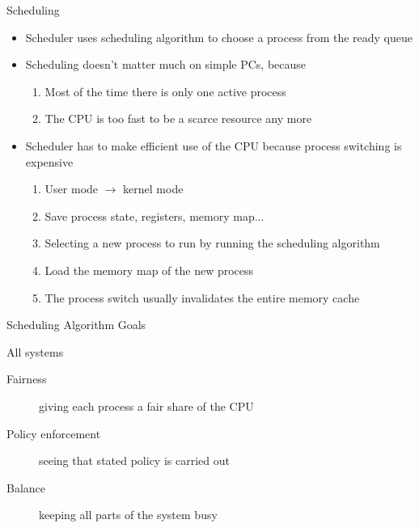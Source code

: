 \begin{frame}{Scheduling}
  \begin{itemize}
  \item \alert{Scheduler} uses \alert{scheduling algorithm} to choose a process from the ready
    queue
  \item Scheduling doesn't matter much on simple PCs, because
    \begin{enumerate}
    \item Most of the time there is only one active process
    \item The CPU is too fast to be a scarce resource any more
    \end{enumerate}
  \item Scheduler has to make efficient use of the CPU because process switching is expensive
    \begin{enumerate}
    \item User mode $\rightarrow{}$ kernel mode
    \item Save process state, registers, memory map...
    \item Selecting a new process to run by running the scheduling algorithm
    \item Load the memory map of the new process
    \item The process switch usually invalidates the entire memory cache
    \end{enumerate}
  \end{itemize}
\end{frame}

\begin{frame}{Scheduling Algorithm Goals}
  \begin{block}{All systems}
    \begin{description}
    \item[Fairness] giving each process a fair share of the CPU
    \item[Policy enforcement] seeing that stated policy is carried out
    \item[Balance] keeping all parts of the system busy
    \end{description}
  \end{block}
\end{frame}


